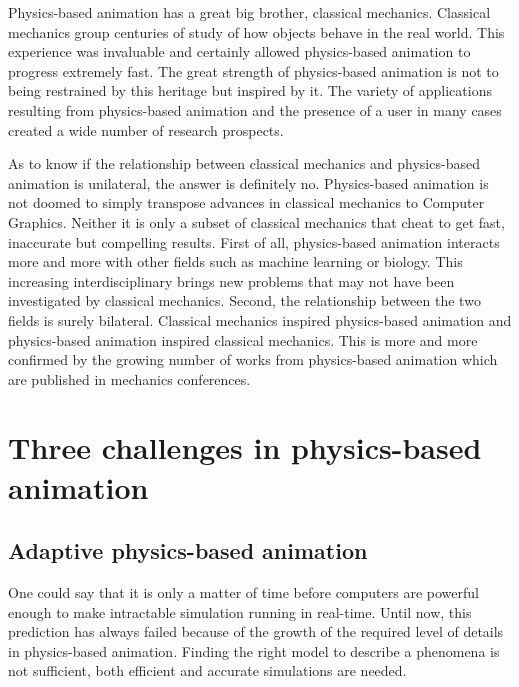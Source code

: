 Physics-based animation has a great big brother, classical mechanics. Classical mechanics group centuries of study of how objects behave in the real world. This experience was invaluable and certainly allowed physics-based animation to progress extremely fast. The great strength of physics-based animation is not to being restrained by this heritage but inspired by it. The variety of applications resulting from physics-based animation and the presence of a user in many cases  created a wide number of research prospects.

As to know if the relationship between classical mechanics and physics-based animation is unilateral, the answer is definitely no. Physics-based animation is not doomed to simply transpose advances in classical mechanics to Computer Graphics. Neither it is only a subset of classical mechanics that cheat to get fast, inaccurate but compelling results. First of all, physics-based animation interacts more and more with other fields such as machine learning or biology. This increasing interdisciplinary brings new problems that may not have been investigated by classical mechanics. Second, the relationship between the two fields is surely bilateral. Classical mechanics inspired physics-based animation and physics-based animation inspired classical mechanics. This is more and more confirmed by the growing number of works from physics-based animation which are published in mechanics conferences.

\section{Three challenges in physics-based animation}

\subsection{Adaptive physics-based animation}
One could say that it is only a matter of time before computers are powerful enough to make intractable simulation running in real-time. Until now, this prediction has always failed because of the growth of the required level of details in physics-based animation. Finding the right model to describe a phenomena is not sufficient, both efficient and accurate simulations are needed.

